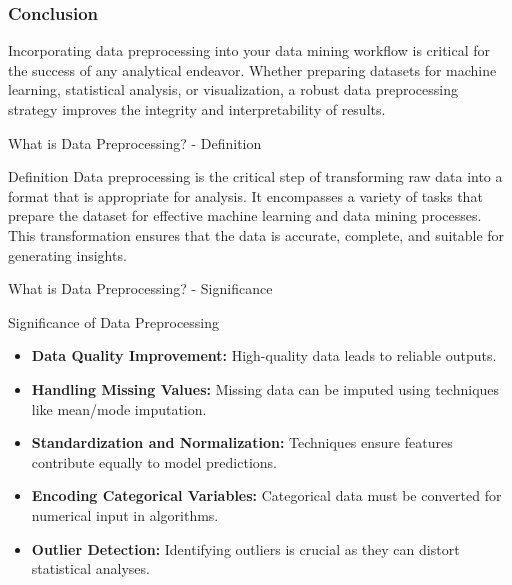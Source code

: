 \documentclass[aspectratio=169]{beamer}
\begin{document}
\begin{frame}[fragile]
    \frametitle{Conclusion}
    Incorporating data preprocessing into your data mining workflow is critical for the success of any analytical endeavor. Whether preparing datasets for machine learning, statistical analysis, or visualization, a robust data preprocessing strategy improves the integrity and interpretability of results.
\end{frame}

\begin{frame}[fragile]{What is Data Preprocessing? - Definition}
    \begin{block}{Definition}
        Data preprocessing is the critical step of transforming raw data into a format that is appropriate for analysis. 
        It encompasses a variety of tasks that prepare the dataset for effective machine learning and data mining processes. 
        This transformation ensures that the data is accurate, complete, and suitable for generating insights.
    \end{block}
\end{frame}

\begin{frame}[fragile]{What is Data Preprocessing? - Significance}
    \begin{block}{Significance of Data Preprocessing}
        \begin{itemize}
            \item \textbf{Data Quality Improvement:} High-quality data leads to reliable outputs.
            \item \textbf{Handling Missing Values:} Missing data can be imputed using techniques like mean/mode imputation.
            \item \textbf{Standardization and Normalization:} Techniques ensure features contribute equally to model predictions.
            \item \textbf{Encoding Categorical Variables:} Categorical data must be converted for numerical input in algorithms.
            \item \textbf{Outlier Detection:} Identifying outliers is crucial as they can distort statistical analyses.
        \end{itemize}
    \end{block}
\end{frame}
\end{document}
